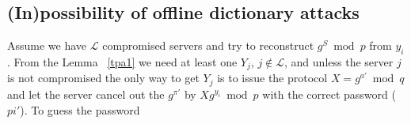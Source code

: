 \subsection{(In)possibility of offline dictionary attacks}
Assume we have $\mathcal{L}$ compromised servers and try to reconstruct $g^S
\bmod p$ from ${y_i}$. From the Lemma ~\ref{tpa1} we need at least one
$Y_j$, $j \notin \mathcal{L}$, and unless the server $j$ is not
compromised the only way to get $Y_j$ is to issue the protocol $X =
g^{a'} \bmod q$ and let the server cancel out the $g^{\pi'}$ by
$Xg^{y_i} \bmod p$ with the correct password ($pi'$). To guess the
password 
